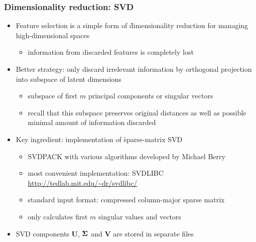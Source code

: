 \begin{frame}
  \frametitle{Dimensionality reduction: SVD}

  \begin{itemize}
  \item Feature selection is a simple form of \h{dimensionality reduction} for
    managing high-dimensional spaces
    \begin{itemize}
    \item information from discarded features is completely lost
    \end{itemize}
    \pause
  \item Better strategy: only discard irrelevant information by orthogonal
    projection into subspace of latent dimensions
    \begin{itemize}
    \item subspace of first $m$ principal components or singular vectors
    \item recall that this subspace preserves original distances as well as
      possible \so minimal amount of information discarded
    \end{itemize}
    \pause
  \item Key ingredient: implementation of \h{sparse-matrix SVD}
    \begin{itemize}
    \item SVDPACK with various algorithms developed by Michael Berry
    \item most convenient implementation: SVDLIBC\\
      \url{http://tedlab.mit.edu/~dr/svdlibc/}
    \item standard input format: compressed column-major sparse matrix
    \item only calculates first $m$ singular values and vectors
    \end{itemize}
    \pause
  \item SVD components $\mathbf{U}$, $\boldsymbol{\Sigma}$ and $\mathbf{V}$ are stored in
    separate files
  \end{itemize}
\end{frame}

